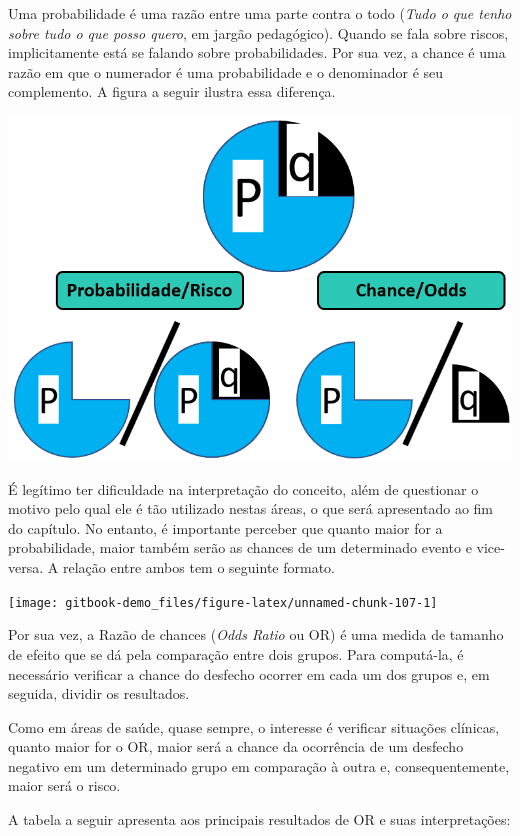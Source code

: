 \documentclass[
]{book}
\begin{document}
Uma probabilidade é uma razão entre uma parte contra o todo (\emph{Tudo o que tenho sobre tudo o que posso quero}, em jargão pedagógico). Quando se fala sobre riscos, implicitamente está se falando sobre probabilidades. Por sua vez, a chance é uma razão em que o numerador é uma probabilidade e o denominador é seu complemento. A figura a seguir ilustra essa diferença.

\includegraphics{./img/cap_reg_log_odds.png}

É legítimo ter dificuldade na interpretação do conceito, além de questionar o motivo pelo qual ele é tão utilizado nestas áreas, o que será apresentado ao fim do capítulo. No entanto, é importante perceber que quanto maior for a probabilidade, maior também serão as chances de um determinado evento e vice-versa. A relação entre ambos tem o seguinte formato.

\begin{center}\texttt{[image: gitbook-demo\_files/figure-latex/unnamed-chunk-107-1]} \end{center}

Por sua vez, a Razão de chances (\emph{Odds Ratio} ou OR) é uma medida de tamanho de efeito que se dá pela comparação entre dois grupos. Para computá-la, é necessário verificar a chance do desfecho ocorrer em cada um dos grupos e, em seguida, dividir os resultados.

Como em áreas de saúde, quase sempre, o interesse é verificar situações clínicas, quanto maior for o OR, maior será a chance da ocorrência de um desfecho negativo em um determinado grupo em comparação à outra e, consequentemente, maior será o risco.

A tabela a seguir apresenta aos principais resultados de OR e suas interpretações:
\end{document}
